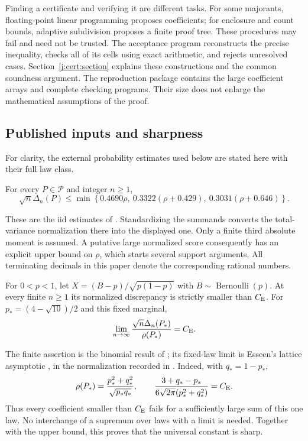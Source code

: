 Finding a certificate and verifying it are different tasks. For some
majorants, floating-point linear programming proposes coefficients;
for enclosure and count bounds, adaptive subdivision proposes a
finite proof tree. These procedures may fail and need not be trusted.
The acceptance program reconstructs the precise inequality, checks
all of its cells using exact arithmetic, and rejects unresolved cases.
Section~\ref{j:cert:section} explains these constructions and the
common soundness argument. The reproduction package contains the
large coefficient arrays and complete checking programs. Their size
does not enlarge the mathematical assumptions of the proof.

\subsection{Published inputs and sharpness}

For clarity, the external probability estimates used below are stated
here with their full law class.
\begin{proposition}\label{j:external:affine}
For every $P\in\mathcal P$ and integer $n\ge1$,
\[
 \sqrt n\Delta_n(P)\le
 \min\left\{0.4690\rho,\ 0.3322(\rho+0.429),\
                         0.3031(\rho+0.646)\right\}.
\]
\end{proposition}
These are the iid estimates of \citet{Shevtsova2013}. Standardizing
the summands converts the total-variance normalization there into the
displayed one. Only a finite third absolute moment is assumed. A
putative large normalized score consequently has an explicit upper
bound on $\rho$, which starts several support arguments. All
terminating decimals in this paper denote the corresponding rational
numbers.

\begin{proposition}[Finite binomial comparison and the lower limit]
\label{j:external:binomial}\label{j:external:limit}
For $0<p<1$, let $X=(B-p)/\sqrt{p(1-p)}$ with
$B\sim\operatorname{Bernoulli}(p)$. At every finite $n\ge1$ its
normalized discrepancy is strictly smaller than $C_{\mathrm E}$.
For $p_*=(4-\sqrt{10})/2$ and this fixed marginal,
\[
 \lim_{n\to\infty}\frac{\sqrt n\Delta_n(P_*)}{\rho(P_*)}=C_{\mathrm E}.
\]
\end{proposition}
The finite assertion is the binomial result of
\citet[Theorem~1]{Schulz2016}; its fixed-law limit is Esseen's lattice
asymptotic \cite{Esseen1956}, in the normalization recorded in
\citet[Remarks~4.1--4.2]{Schulz2016}. Indeed, with $q_*=1-p_*$,
\[
 \rho(P_*)=\frac{p_*^2+q_*^2}{\sqrt{p_*q_*}},\qquad
 \frac{3+q_*-p_*}{6\sqrt{2\pi}(p_*^2+q_*^2)}=C_{\mathrm E}.
\]
Thus every coefficient smaller than $C_{\mathrm E}$ fails for a sufficiently
large sum of this one law. No interchange of a supremum over laws
with a limit is needed. Together with the upper bound, this proves
that the universal constant is sharp.

